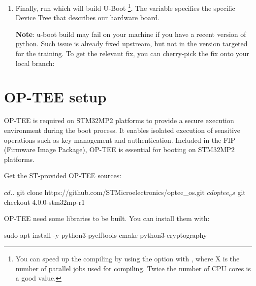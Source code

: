 \begin{enumerate}
Install the following packages which should be needed to compile
U-Boot for your board:


\item Finally, run  which
  will build U-Boot
  \footnote{You can speed up the
  compiling by using the  option with , where X
  is the number of parallel jobs used for compiling. Twice the
  number of CPU cores is a good value.}.
  The  variable specifies the specific
  Device Tree that describes our hardware board.

{\bf Note}: u-boot build may fail on your machine if you have a recent
version of python. Such issue is
\href{https://git.u-boot-project.org/u-boot/u-boot/-/commit/a63456b9191fae2fe49f4b121e025792022e3950}{already
fixed upstream}, but not in the version targeted for the training. To get the relevant fix,
you can cherry-pick the fix onto your local branch:

\end{enumerate}

\section{OP-TEE setup}

OP-TEE is required on STM32MP2 platforms to provide a secure execution
environment during the boot process. It enables isolated execution of
sensitive operations such as key management and authentication.
Included in the FIP (Firmware Image Package), OP-TEE is essential for
booting on STM32MP2 platforms.

Get the ST-provided OP-TEE sources:

\begin{bashinput}
$ cd ..
$ git clone https://github.com/STMicroelectronics/optee_os.git
$ cd optee_os
$ git checkout 4.0.0-stm32mp-r1
\end{bashinput}

OP-TEE need some libraries to be built. You can install them with:
\begin{bashinput}
sudo apt install -y python3-pyelftools cmake python3-cryptography
\end{bashinput}

